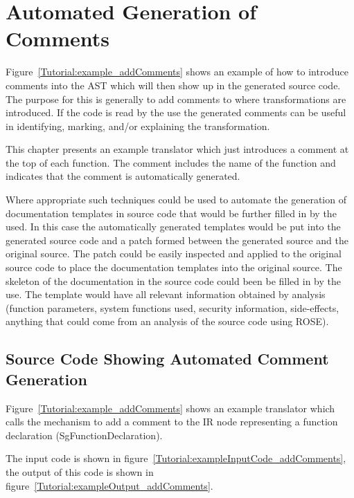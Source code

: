 \section{Automated Generation of Comments}
\label{sec:AutomatedGenerationOfComments}

   Figure~\ref{Tutorial:example_addComments} shows an
example of how to introduce comments into the AST which will
then show up in the generated source code. The purpose for this is
generally to add comments to where transformations are introduced.
If the code is read by the use the generated comments can be
useful in identifying, marking, and/or explaining the transformation.

This chapter presents an example translator which just introduces a 
comment at the top of each function.  The comment includes the
name of the function and indicates that the comment is automatically 
generated.

Where appropriate such techniques could be used to automate the 
generation of documentation templates in source code that would be
further filled in by the used.  In this case the automatically generated
templates would be put into the generated source code and a patch formed
between the generated source and the original source.  The patch could
be easily inspected and applied to the original source code to place
the documentation templates into the original source.  The skeleton
of the documentation in the source code could been be filled in by
the use.  The template would have all relevant information obtained by analysis
(function parameters, system functions used, security information, side-effects,
anything that could come from an analysis of the source code using ROSE).

\subsection{Source Code Showing Automated Comment Generation}

    Figure~\ref{Tutorial:example_addComments}
shows an example translator which calls the mechanism to 
add a comment to the IR node representing a function declaration (SgFunctionDeclaration).

The input code is shown in figure~\ref{Tutorial:exampleInputCode_addComments},
the output of this code is shown in 
figure~\ref{Tutorial:exampleOutput_addComments}.

